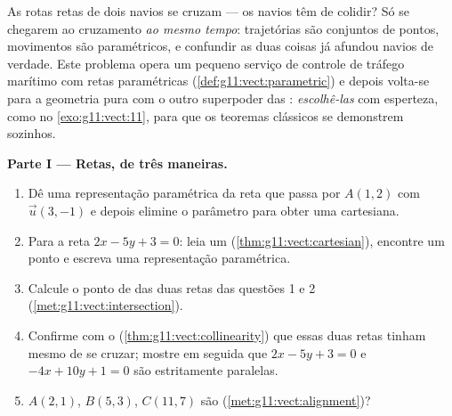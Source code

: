 \begin{problem}
\label{pb:g11:vect:1}
As rotas retas de dois navios se cruzam --- os navios têm de
colidir? Só se chegarem ao cruzamento \emph{ao mesmo tempo}:
trajetórias são conjuntos de pontos, movimentos são paramétricos,
e confundir as duas coisas já afundou navios de verdade. Este
problema opera um pequeno serviço de controle de tráfego marítimo
com retas paramétricas (\cref{def:g11:vect:parametric}) e depois
volta-se para a geometria pura com o outro superpoder das
: \emph{escolhê-las} com esperteza, como no
\cref{exo:g11:vect:11}, para que os teoremas clássicos se
demonstrem sozinhos.

\medskip
\noindent\textbf{Parte I --- Retas, de três maneiras.}
\begin{enumerate}
  \item Dê uma representação paramétrica da reta que passa por
        $A(1, 2)$ com  $\vec u(3, -1)$ e depois
        elimine o parâmetro para obter uma  cartesiana.
  \item Para a reta $2x - 5y + 3 = 0$: leia um 
        (\cref{thm:g11:vect:cartesian}), encontre um ponto e
        escreva uma representação paramétrica.
  \item Calcule o ponto de  das duas retas das questões
        1 e 2 (\cref{met:g11:vect:intersection}).
  \item Confirme com o 
        (\cref{thm:g11:vect:collinearity}) que essas duas retas
        tinham mesmo de se cruzar; mostre em seguida que
        $2x - 5y + 3 = 0$ e $-4x + 10y + 1 = 0$ são estritamente
        paralelas.
  \item $A(2, 1)$, $B(5, 3)$, $C(11, 7)$ são 
        (\cref{met:g11:vect:alignment})?
\end{enumerate}


\end{problem}
